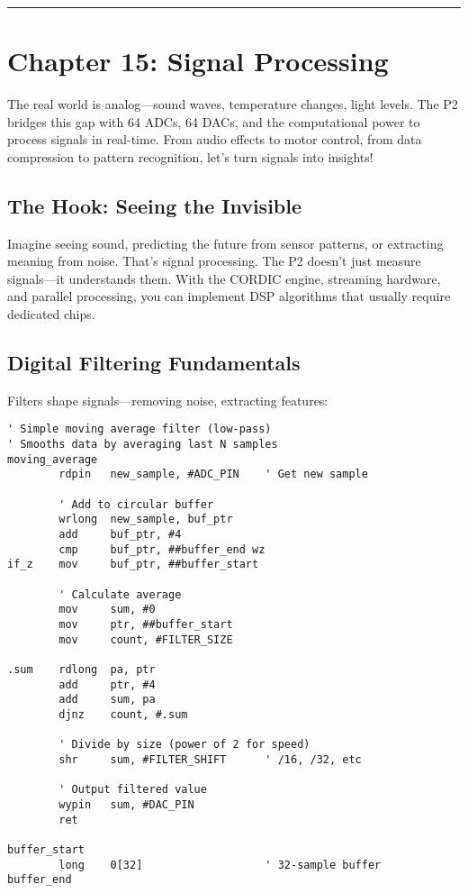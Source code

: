 \documentclass[11pt]{book}
\begin{document}
\begin{center}\rule{0.5\linewidth}{0.5pt}\end{center}

\hypertarget{chapter-15-signal-processing}{%
\section{Chapter 15: Signal
Processing}\label{chapter-15-signal-processing}}

The real world is analog---sound waves, temperature changes, light
levels. The P2 bridges this gap with 64 ADCs, 64 DACs, and the
computational power to process signals in real-time. From audio effects
to motor control, from data compression to pattern recognition, let's
turn signals into insights!

\hypertarget{the-hook-seeing-the-invisible}{%
\subsection{The Hook: Seeing the
Invisible}\label{the-hook-seeing-the-invisible}}

Imagine seeing sound, predicting the future from sensor patterns, or
extracting meaning from noise. That's signal processing. The P2 doesn't
just measure signals---it understands them. With the CORDIC engine,
streaming hardware, and parallel processing, you can implement DSP
algorithms that usually require dedicated chips.

\hypertarget{digital-filtering-fundamentals}{%
\subsection{Digital Filtering
Fundamentals}\label{digital-filtering-fundamentals}}

Filters shape signals---removing noise, extracting features:

\begin{lstlisting}
' Simple moving average filter (low-pass)
' Smooths data by averaging last N samples
moving_average
        rdpin   new_sample, #ADC_PIN    ' Get new sample
        
        ' Add to circular buffer
        wrlong  new_sample, buf_ptr
        add     buf_ptr, #4
        cmp     buf_ptr, ##buffer_end wz
if_z    mov     buf_ptr, ##buffer_start
        
        ' Calculate average
        mov     sum, #0
        mov     ptr, ##buffer_start
        mov     count, #FILTER_SIZE
        
.sum    rdlong  pa, ptr
        add     ptr, #4
        add     sum, pa
        djnz    count, #.sum
        
        ' Divide by size (power of 2 for speed)
        shr     sum, #FILTER_SHIFT      ' /16, /32, etc
        
        ' Output filtered value
        wypin   sum, #DAC_PIN
        ret

buffer_start
        long    0[32]                   ' 32-sample buffer
buffer_end
\end{lstlisting}
\end{document}
